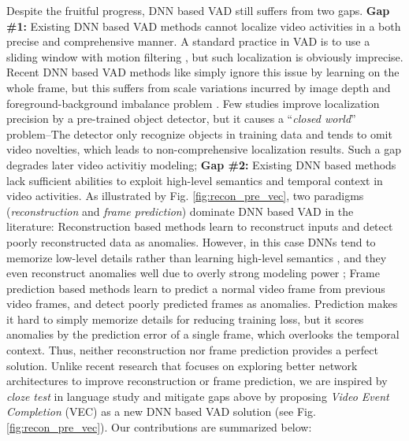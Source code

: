 \documentclass[sigconf]{acmart}
\begin{document}
Despite the fruitful progress, DNN based VAD still suffers from two gaps. \textbf{Gap \#1:} Existing DNN based VAD methods cannot localize video activities in a both precise and comprehensive manner. A standard practice in VAD is to use a sliding window with motion filtering \cite{xu2017detecting,sabokrou2018deep}, but such localization is obviously imprecise. Recent DNN based VAD methods like \cite{liu2018future,nguyen2019anomaly,ye2019anopcn} simply ignore this issue by learning on the whole frame, but this suffers from scale variations incurred by image depth and foreground-background imbalance problem \cite{liu2019exploring,zhou2019attention}. Few studies \cite{hinami2017joint,ionescu2019object} improve localization precision by a pre-trained object detector, but it causes a ``\textit{closed world}'' problem--The detector only recognize objects in training data and tends to omit video novelties, which leads to non-comprehensive localization results. Such a gap degrades later video activitiy modeling; \textbf{Gap \#2:} Existing DNN based methods lack sufficient abilities to exploit high-level semantics and temporal context in video activities. As illustrated by Fig. \ref{fig:recon_pre_vec}, two paradigms (\textit{reconstruction} and \textit{frame prediction}) dominate DNN based VAD in the literature: Reconstruction based methods learn to reconstruct inputs and detect poorly reconstructed data as anomalies. However, in this case DNNs tend to memorize low-level details rather than learning high-level semantics \cite{larsen2016autoencoding}, and they even reconstruct anomalies well due to overly strong modeling power \cite{Gong_2019_ICCV}; Frame prediction based methods learn to predict a normal video frame from previous video frames, and detect poorly predicted frames as anomalies. Prediction makes it hard to simply memorize details for reducing training loss, but it scores anomalies by the prediction error of a single frame, which overlooks the temporal context. Thus, neither reconstruction nor frame prediction provides a perfect solution. Unlike recent research that focuses on exploring better network architectures to improve reconstruction or frame prediction, we are inspired by \textit{cloze test} in language study and mitigate gaps above by proposing \textit{Video Event Completion} (VEC) as a new DNN based VAD solution (see Fig. \ref{fig:recon_pre_vec}). Our contributions are summarized below:
\end{document}
